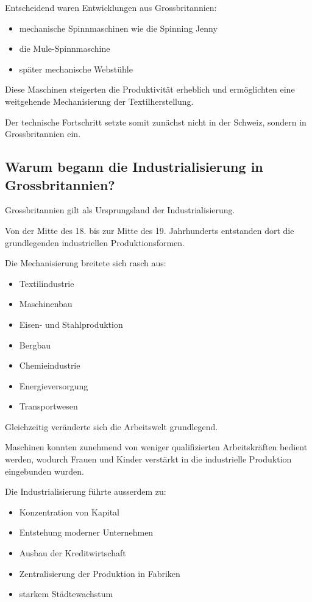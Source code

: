 Entscheidend waren Entwicklungen aus Grossbritannien:

\begin{itemize}
    \item mechanische Spinnmaschinen wie die Spinning Jenny
    \item die Mule-Spinnmaschine
    \item später mechanische Webstühle
\end{itemize}

Diese Maschinen steigerten die Produktivität erheblich
und ermöglichten eine weitgehende Mechanisierung der Textilherstellung.

Der technische Fortschritt setzte somit zunächst nicht in der Schweiz,
sondern in Grossbritannien ein. 

\subsection{Warum begann die Industrialisierung in Grossbritannien?}

Grossbritannien gilt als Ursprungsland der Industrialisierung.

Von der Mitte des 18. bis zur Mitte des 19. Jahrhunderts
entstanden dort die grundlegenden industriellen Produktionsformen.

Die Mechanisierung breitete sich rasch aus:

\begin{itemize}
    \item Textilindustrie
    \item Maschinenbau
    \item Eisen- und Stahlproduktion
    \item Bergbau
    \item Chemieindustrie
    \item Energieversorgung
    \item Transportwesen
\end{itemize}

Gleichzeitig veränderte sich die Arbeitswelt grundlegend.

Maschinen konnten zunehmend von weniger qualifizierten Arbeitskräften bedient werden,
wodurch Frauen und Kinder verstärkt in die industrielle Produktion eingebunden wurden.

Die Industrialisierung führte ausserdem zu:

\begin{itemize}
    \item Konzentration von Kapital
    \item Entstehung moderner Unternehmen
    \item Ausbau der Kreditwirtschaft
    \item Zentralisierung der Produktion in Fabriken
    \item starkem Städtewachstum
\end{itemize}

